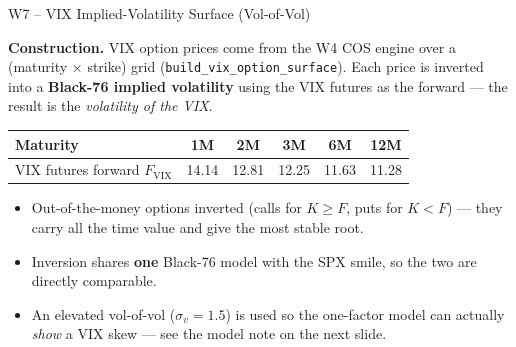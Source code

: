 \documentclass[aspectratio=169, 11pt]{beamer}
\begin{document}
\begin{frame}{W7 -- VIX Implied-Volatility Surface (Vol-of-Vol)}

\textbf{Construction.}\; VIX option prices come from the W4 COS engine over a
(maturity $\times$ strike) grid (\texttt{build\_vix\_option\_surface}). Each price is
inverted into a \textbf{Black-76 implied volatility} using the VIX futures as the
forward --- the result is the \textit{volatility of the VIX}.

\medskip
\begin{center}
\begin{tabular}{lccccc}
  \toprule
  Maturity & 1M & 2M & 3M & 6M & 12M \\
  \midrule
  VIX futures forward $F_{\mathrm{VIX}}$ & 14.14 & 12.81 & 12.25 & 11.63 & 11.28 \\
  \bottomrule
\end{tabular}
\end{center}

\medskip
\begin{itemize}
  \item Out-of-the-money options inverted (calls for $K \ge F$, puts for $K < F$) --- they carry all the time value and give the most stable root.
  \item Inversion shares \textbf{one} Black-76 model with the SPX smile, so the two are directly comparable.
  \item An elevated vol-of-vol ($\sigma_v = 1.5$) is used so the one-factor model can actually \textit{show} a VIX skew --- see the model note on the next slide.
\end{itemize}
\end{frame}
\end{document}

